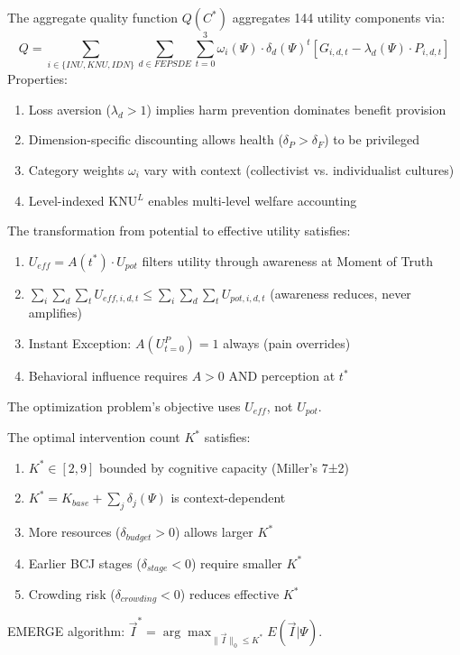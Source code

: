 \begin{theorem}
The aggregate quality function $Q(C^*)$ aggregates 144 utility components via:
\[
Q = \sum_{i \in \{INU, KNU, IDN\}} \sum_{d \in FEPSDE} \sum_{t=0}^{3}
    \omega_i(\Psi) \cdot \delta_d(\Psi)^t \left[ G_{i,d,t} - \lambda_d(\Psi) \cdot P_{i,d,t} \right]
\]
Properties:
\begin{enumerate}
\item Loss aversion ($\lambda_d > 1$) implies harm prevention dominates benefit provision
\item Dimension-specific discounting allows health ($\delta_P > \delta_F$) to be privileged
\item Category weights $\omega_i$ vary with context (collectivist vs. individualist cultures)
\item Level-indexed KNU$^L$ enables multi-level welfare accounting
\end{enumerate}
\end{theorem}

\begin{theorem}
The transformation from potential to effective utility satisfies:
\begin{enumerate}
\item $U_{eff} = A(t^*) \cdot U_{pot}$ filters utility through awareness at Moment of Truth
\item $\sum_i \sum_d \sum_t U_{eff,i,d,t} \leq \sum_i \sum_d \sum_t U_{pot,i,d,t}$ (awareness reduces, never amplifies)
\item Instant Exception: $A(U^P_{t=0}) = 1$ always (pain overrides)
\item Behavioral influence requires $A > 0$ AND perception at $t^*$
\end{enumerate}
The optimization problem's objective uses $U_{eff}$, not $U_{pot}$.
\end{theorem}

\begin{theorem}
The optimal intervention count $K^*$ satisfies:
\begin{enumerate}
\item $K^* \in [2, 9]$ bounded by cognitive capacity (Miller's 7±2)
\item $K^* = K_{base} + \sum_j \delta_j(\Psi)$ is context-dependent
\item More resources ($\delta_{budget} > 0$) allows larger $K^*$
\item Earlier BCJ stages ($\delta_{stage} < 0$) require smaller $K^*$
\item Crowding risk ($\delta_{crowding} < 0$) reduces effective $K^*$
\end{enumerate}
EMERGE algorithm: $\vec{I}^* = \arg\max_{\|\vec{I}\|_0 \leq K^*} E(\vec{I} | \Psi)$.
\end{theorem}

